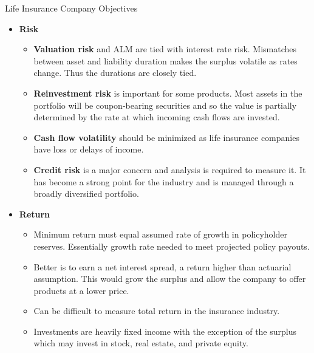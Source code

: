 \documentclass[../custom]{flashcards}
\begin{document}
\begin{flashcard}[\studyArea]{Life Insurance Company Objectives}
    \begin{itemize}[nosep]
        \item \textbf{Risk}
            \begin{itemize}[itemsep=.2\itemsep]
                \item \textbf{Valuation risk} and ALM are tied with interest rate risk. Mismatches between asset and liability duration makes the surplus volatile as rates change. Thus the durations are closely tied.
                \item \textbf{Reinvestment risk} is important for some products. Most assets in the portfolio will be coupon-bearing securities and so the value is partially determined by the rate at which incoming cash flows are invested.
                \item \textbf{Cash flow volatility} should be minimized as life insurance companies have loss or delays of income.
                \item \textbf{Credit risk} is a major concern and analysis is required to measure it. It has become a strong point for the industry and is managed through a broadly diversified portfolio.
            \end{itemize}
        \item \textbf{Return}
            \begin{itemize}[itemsep=.2\itemsep]
                \item Minimum return must equal assumed rate of growth in policyholder reserves. Essentially growth rate needed to meet projected policy payouts.
                \item Better is to earn a net interest spread, a return higher than actuarial assumption. This would grow the surplus and allow the company to offer products at a lower price.
                \item Can be difficult to measure total return in the insurance industry.
                \item Investments are heavily fixed income with the exception of the surplus which may invest in stock, real estate, and private equity.
            \end{itemize}
    \end{itemize}
\end{flashcard}

\renewcommand{\studyArea}{Equity Portfolio Management}
\end{document}
